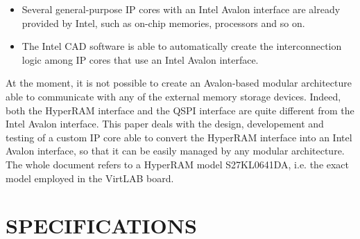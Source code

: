 \documentclass[10pt, english, a4paper, titlepage, oneside]{book}
\begin{document}
\vspace{2mm}
\begin{itemize}
    \item Several general-purpose IP cores with an Intel Avalon interface are already provided by Intel, such as on-chip memories, processors and so on.
    \vspace{1mm}
    \item The Intel CAD software is able to automatically create the interconnection logic among \acrshort{IP} cores that use an Intel Avalon interface.
\end{itemize}
\vspace{4mm}
At the moment, it is not possible to create an Avalon-based modular architecture able to communicate with any of the external memory storage devices. Indeed, both the HyperRAM interface and the QSPI interface are quite different from the Intel Avalon interface. This paper deals with the design, developement and testing of a custom IP core able to convert the HyperRAM interface into an Intel Avalon interface, so that it can be easily managed by any modular architecture. The whole document refers to a HyperRAM model S27KL0641DA, i.e. the exact model employed in the VirtLAB board.

\chapter{SPECIFICATIONS} \label{specifications}
\end{document}

